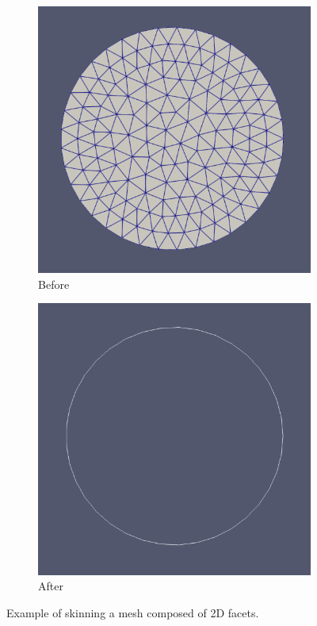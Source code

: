 \documentclass[12pt, letterpaper]{article}
\begin{document}
\begin{figure}[ht]
	\begin{subfigure}{0.48\textwidth}
		\includegraphics[width=\linewidth]{processExample/circle.png}
		\caption{Before}
	\end{subfigure}
	\hspace*{\fill}	
	\begin{subfigure}{0.48\textwidth}
		\includegraphics[width=\linewidth]{processExample/skin.png}
		\caption{After}
	\end{subfigure}	
	\caption{Example of skinning a mesh composed of 2D facets.}
	\label{2DSkinningComp}
\end{figure}
\end{document}
